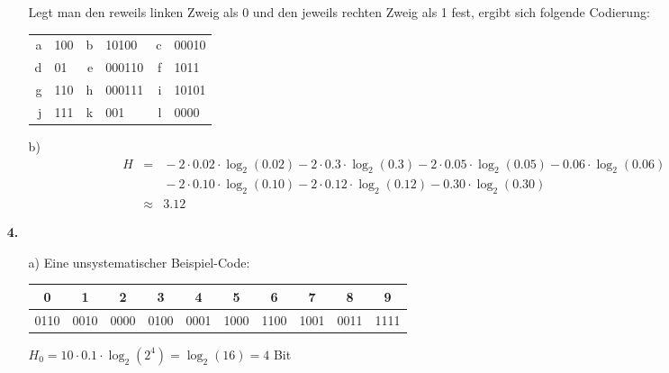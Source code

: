 \documentclass[a4paper,10pt]{scrartcl}
\begin{document}
\begin{enumerate}
\begin{enumerate}
\begin{figure}[!h]
                \end{figure}

                Legt man den reweils linken Zweig als 0 und den jeweils rechten Zweig
                als 1 fest, ergibt sich folgende Codierung:

                \begin{tabular}{rl|rl|rl}
                    a & 100    & b & 10100  & c & 00010 \\
                    d & 01     & e & 000110 & f & 1011  \\
                    g & 110    & h & 000111 & i & 10101 \\
                    j & 111    & k & 001    & l & 0000
                \end{tabular}

            \item[b)]
            $$\begin{array}{crl}
            H &=& {}
                - 2 \cdot 0.02 \cdot \log_2(0.02) - 2 \cdot 0.3 \cdot \log_2(0.3)
                - 2 \cdot 0.05 \cdot \log_2(0.05) - 0.06 \cdot \log_2(0.06)\\
            &&{}- 2 \cdot 0.10 \cdot \log_2(0.10) - 2 \cdot 0.12 \cdot \log_2(0.12)
                - 0.30 \cdot \log_2(0.30)\\
            &\approx& 3.12
            \end{array}$$

        \end{enumerate}

    \item[\textbf{4.}]
        \begin{enumerate}
            \item[a)]
                Eine unsystematischer Beispiel-Code:

                \begin{tabular}{c|c|c|c|c|c|c|c|c|c}
                    0 & 1 & 2 & 3 & 4 & 5 & 6 & 7 & 8 & 9 \\
                    \hline
                    0110 & 0010 & 0000 & 0100 & 0001 & 1000 & 1100 & 1001 & 0011 & 1111
                \end{tabular}

                $H_0 = 10 \cdot 0.1 \cdot \log_2(2^4) = \log_2(16) = 4$ Bit


\end{enumerate}
\end{enumerate}
\end{document}
